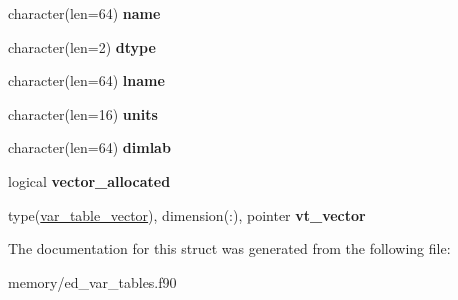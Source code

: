 \begin{DoxyCompactItemize}
\item 
\hypertarget{structed__var__tables_1_1var__table_a0af071c5053800dc0920095f9ad100e3}{
character(len=64) {\bfseries name}}
\label{structed__var__tables_1_1var__table_a0af071c5053800dc0920095f9ad100e3}

\item 
\hypertarget{structed__var__tables_1_1var__table_a9c4a28ac74562c96c391f23cc8129805}{
character(len=2) {\bfseries dtype}}
\label{structed__var__tables_1_1var__table_a9c4a28ac74562c96c391f23cc8129805}

\item 
\hypertarget{structed__var__tables_1_1var__table_a8e810273668252a3361505190f597c1e}{
character(len=64) {\bfseries lname}}
\label{structed__var__tables_1_1var__table_a8e810273668252a3361505190f597c1e}

\item 
\hypertarget{structed__var__tables_1_1var__table_a08749e252d2a12144da6bf5bd1956f26}{
character(len=16) {\bfseries units}}
\label{structed__var__tables_1_1var__table_a08749e252d2a12144da6bf5bd1956f26}

\item 
\hypertarget{structed__var__tables_1_1var__table_a0909c2a3703ab2bdf07815ad0ba14aae}{
character(len=64) {\bfseries dimlab}}
\label{structed__var__tables_1_1var__table_a0909c2a3703ab2bdf07815ad0ba14aae}

\item 
\hypertarget{structed__var__tables_1_1var__table_a41255913720040623a6bf9dd5b8267c5}{
logical {\bfseries vector\_\-allocated}}
\label{structed__var__tables_1_1var__table_a41255913720040623a6bf9dd5b8267c5}

\item 
\hypertarget{structed__var__tables_1_1var__table_ac99a52c79dd0fa80f4f7d21d23059103}{
type(\hyperlink{structed__var__tables_1_1var__table__vector}{var\_\-table\_\-vector}), dimension(:), pointer {\bfseries vt\_\-vector}}
\label{structed__var__tables_1_1var__table_ac99a52c79dd0fa80f4f7d21d23059103}

\end{DoxyCompactItemize}


The documentation for this struct was generated from the following file:\begin{DoxyCompactItemize}
\item 
memory/ed\_\-var\_\-tables.f90\end{DoxyCompactItemize}
